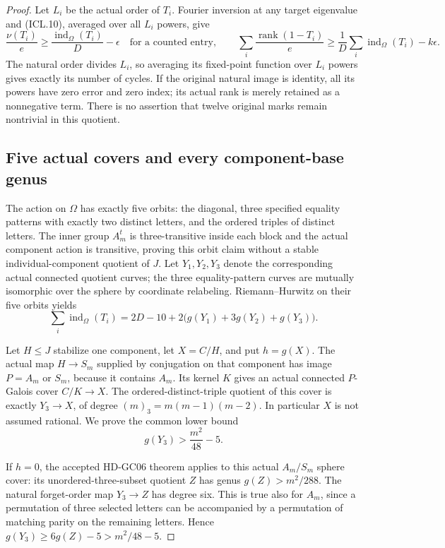 \begin{proof}
Let $L_i$ be the actual order of $T_i$.  Fourier inversion at
any target eigenvalue and (ICL.10), averaged over all $L_i$
powers, give
\[
 \frac{\nu(T_i)}e
 \ge\frac{\operatorname{ind}_\Omega(T_i)}D-\epsilon
 \quad\text{for a counted entry},
 \qquad
 \sum_i\frac{\operatorname{rank}(1-T_i)}e
 \ge\frac1D\sum_i\operatorname{ind}_\Omega(T_i)-k\epsilon.
 \tag{ICL.13}
\]
The natural order divides $L_i$, so averaging its fixed-point
function over $L_i$ powers gives exactly its number of cycles.
If the original natural image is identity, all its powers have
zero error and zero index; its actual rank is merely retained
as a nonnegative term.  There is no assertion that twelve
original marks remain nontrivial in this quotient.

\subsection*{Five actual covers and every component-base genus}

The action on $\Omega$ has exactly five orbits: the diagonal,
three specified equality patterns with exactly two distinct
letters, and the ordered triples of distinct letters.  The
inner group $A_m^t$ is three-transitive inside each block and
the actual component action is transitive, proving this orbit
claim without a stable individual-component quotient of $J$.
Let $Y_1,Y_2,Y_3$ denote the corresponding actual connected
quotient curves; the three equality-pattern curves are mutually
isomorphic over the sphere by coordinate relabeling.
Riemann--Hurwitz on their five orbits yields
\[
 \sum_i\operatorname{ind}_\Omega(T_i)
 =2D-10+2\bigl(g(Y_1)+3g(Y_2)+g(Y_3)\bigr).
 \tag{ICL.14}
\]

Let $H\le J$ stabilize one component, let $X=C/H$, and put
$h=g(X)$.  The actual map $H\to S_m$ supplied by conjugation
on that component has image $P=A_m$ or $S_m$, because it
contains $A_m$.  Its kernel $K$ gives an actual connected
$P$-Galois cover $C/K\to X$.  The ordered-distinct-triple
quotient of this cover is exactly $Y_3\to X$, of degree
$(m)_3=m(m-1)(m-2)$.  In particular $X$ is not assumed rational.
We prove the common lower bound
\[
                         g(Y_3)>\frac{m^2}{48}-5.
 \tag{ICL.15}
\]

If $h=0$, the accepted HD-GC06 theorem applies to this actual
$A_m/S_m$ sphere cover: its unordered-three-subset quotient $Z$
has genus $g(Z)>m^2/288$.  The natural forget-order map
$Y_3\to Z$ has degree six.  This is true also for $A_m$,
since a permutation of three selected letters can be accompanied
by a permutation of matching parity on the remaining letters.
Hence $g(Y_3)\ge6g(Z)-5>m^2/48-5$.


\end{proof}
